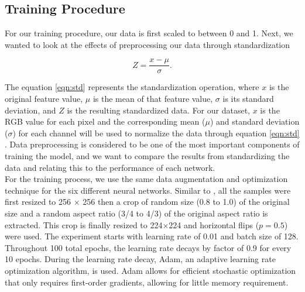 \documentclass[10pt,twocolumn,letterpaper]{article}
\begin{document}
\subsection{Training Procedure}
For our training procedure, our data is first scaled to between 0 and 1. Next, we wanted to look at the effects of preprocessing our data through standardization

\begin{equation}
\label{eqn:std}
Z = \dfrac{x - \mu}{\sigma}.
\end{equation}

The equation \ref{eqn:std} represents the standardization operation, where $x$ is the original feature value, $\mu$ is the mean of that feature value, $\sigma$  is its standard deviation, and $Z$ is the resulting standardized data. 
For our dataset, $x$ is the RGB value for each pixel and the corresponding mean ($\mu$) and standard deviation ($\sigma$) for each channel will be used to normalize the data through equation \ref{eqn:std} . Data preprocessing is considered to be one of the most important components of training the model, and we want to compare the results from standardizing the data and relating this to the performance of each network. \\


For the training process, we use the same data augmentation and optimization technique for the six different neural networks. Similar to \cite{Xue2018dep}, all the samples were first resized to 256 $\times$ 256 then a crop of random size (0.8 to 1.0) of the original size and a random aspect ratio (3/4 to 4/3) of the original aspect ratio is extracted. This crop is finally resized to 224$\times$224 and horizontal flips ($p=0.5$) were used. The experiment starts with learning rate of 0.01 and batch size of 128. Throughout 100 total epochs, the learning rate decays by factor of 0.9 for every 10 epochs. During the learning rate decay, Adam, an adaptive learning rate optimization algorithm, is used. Adam allows for efficient stochastic optimization that only requires first-order gradients, allowing for little memory requirement\cite{Kingma2014adam}. 



{\small


}
\end{document}
